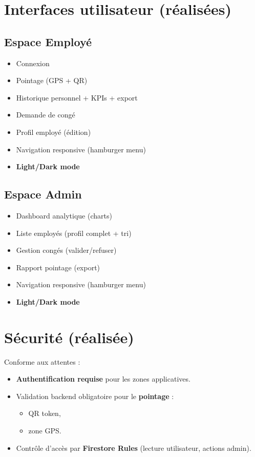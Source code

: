 \documentclass[12pt,a4paper]{article}
\begin{document}
\section{Interfaces utilisateur (réalisées)}
\subsection{Espace Employé}
\begin{itemize}[leftmargin=*]
  \item Connexion
  \item Pointage (GPS + QR)
  \item Historique personnel + KPIs + export
  \item Demande de congé
  \item Profil employé (édition)
  \item Navigation responsive (hamburger menu)
  \item \textbf{Light/Dark mode}
\end{itemize}

\subsection{Espace Admin}
\begin{itemize}[leftmargin=*]
  \item Dashboard analytique (charts)
  \item Liste employés (profil complet + tri)
  \item Gestion congés (valider/refuser)
  \item Rapport pointage (export)
  \item Navigation responsive (hamburger menu)
  \item \textbf{Light/Dark mode}
\end{itemize}

\section{Sécurité (réalisée)}
Conforme aux attentes :
\begin{itemize}[leftmargin=*]
  \item \textbf{Authentification requise} pour les zones applicatives.
  \item Validation backend obligatoire pour le \textbf{pointage} :
  \begin{itemize}
    \item QR token,
    \item zone GPS.
  \end{itemize}
  \item Contrôle d’accès par \textbf{Firestore Rules} (lecture utilisateur, actions admin).
\end{itemize}
\end{document}
